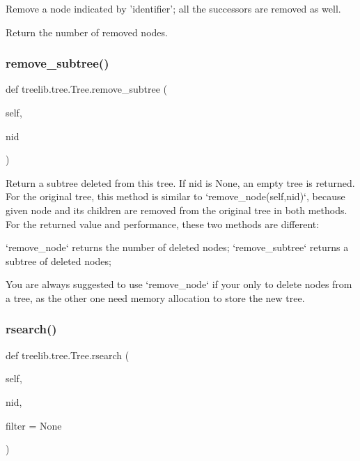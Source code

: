 \begin{DoxyVerb}Remove a node indicated by 'identifier'; all the successors are
removed as well.

Return the number of removed nodes.
\end{DoxyVerb}
 \mbox{\label{classtreelib_1_1tree_1_1Tree_a539eabaac44a993d6be3ee7ab6b031aa}} 
\subsubsection{\texorpdfstring{remove\+\_\+subtree()}{remove\_subtree()}}
{\footnotesize\ttfamily def treelib.\+tree.\+Tree.\+remove\+\_\+subtree (\begin{DoxyParamCaption}\item[{}]{self,  }\item[{}]{nid }\end{DoxyParamCaption})}

\begin{DoxyVerb}Return a subtree deleted from this tree. If nid is None, an
empty tree is returned.
For the original tree, this method is similar to
`remove_node(self,nid)`, because given node and its children
are removed from the original tree in both methods.
For the returned value and performance, these two methods are
different:

    `remove_node` returns the number of deleted nodes;
    `remove_subtree` returns a subtree of deleted nodes;

You are always suggested to use `remove_node` if your only to
delete nodes from a tree, as the other one need memory
allocation to store the new tree.
\end{DoxyVerb}
 \mbox{\label{classtreelib_1_1tree_1_1Tree_a21bc133386f5610b9a9eb720823ca536}} 
\subsubsection{\texorpdfstring{rsearch()}{rsearch()}}
{\footnotesize\ttfamily def treelib.\+tree.\+Tree.\+rsearch (\begin{DoxyParamCaption}\item[{}]{self,  }\item[{}]{nid,  }\item[{}]{filter = {\ttfamily None} }\end{DoxyParamCaption})}


